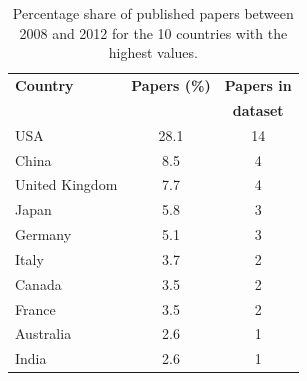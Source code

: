 \documentclass[Report.tex]{subfiles}
\begin{document}
\begin{table}[ht!]
\begin{center}
    \begin{tabular}{ | l | c | c | }\hline
    \textbf{Country} & \textbf{Papers (\%)} & \textbf{Papers in} \\
     & &\textbf{dataset}\\ \hline
    USA & 28.1 & 14\\ \hline
    China & 8.5 & 4\\ \hline
    United Kingdom & 7.7 & 4\\ \hline
    Japan & 5.8 & 3\\ \hline
    Germany & 5.1 & 3\\ \hline
    Italy & 3.7 & 2\\ \hline
    Canada & 3.5 & 2\\ \hline
    France & 3.5 & 2\\ \hline
    Australia & 2.6 & 1\\ \hline
    India & 2.6 & 1\\ \hline
    \end{tabular}
    \caption{Percentage share of published papers between 2008 and 2012 for the 10 countries with the highest values.\label{tab:countries}}
\end{center}
\end{table}
\end{document}
